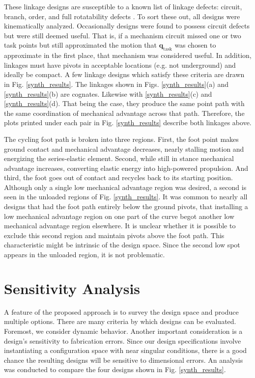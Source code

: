 \documentclass[journal]{IEEEtran}
\begin{document}
These linkage designs are susceptible to a known list of linkage defects: circuit, branch, order, and full rotatability defects \cite{balliDefectsLinkMechanisms2002}.
To sort these out, all designs were kinematically analyzed.
Occasionally designs were found to possess circuit defects but were still deemed useful.
That is, if a mechanism circuit missed one or two task points but still approximated the motion that $\mathbf{q}_\text{task}$ was chosen to approximate in the first place, that mechanism was considered useful.
In addition, linkages must have pivots in acceptable locations (e.g. not underground) and ideally be compact.
A few linkage designs which satisfy these criteria are drawn in Fig. \ref{synth_results}.
The linkages shown in Figs. \ref{synth_results}(a) and \ref{synth_results}(b) are cognates.  Likewise with \ref{synth_results}(c) and \ref{synth_results}(d).
That being the case, they produce the same point path with the same coordination of mechanical advantage across that path.
Therefore, the plots printed under each pair in Fig. \ref{synth_results} describe both linkages above.





The cycling foot path is broken into three regions.  
First, the foot point makes ground contact and mechanical advantage decreases, nearly stalling motion and energizing the series-elastic element.
Second, while still in stance mechanical advantage increases, converting elastic energy into high-powered propulsion.
And third, the foot goes out of contact and recycles back to its starting position.
Although only a single low mechanical advantage region was desired, a second is seen in the unloaded regions of Fig. \ref{synth_results}.
It was common to nearly all designs that had the foot path entirely below the ground pivots, that installing a low mechanical advantage region on one part of the curve begot another low mechanical advantage region elsewhere.
It is unclear whether it is possible to exclude this second region and maintain pivots above the foot path.
This characteristic might be intrinsic of the design space.
Since the second low spot appears in the unloaded region, it is not problematic.


\section{Sensitivity Analysis}
\label{sec:sensitivity}

A feature of the proposed approach is to survey the design space and produce multiple options.
There are many criteria by which designs can be evaluated.
Foremost, we consider dynamic behavior.
Another important consideration is a design's sensitivity to fabrication errors.
Since our design specifications involve instantiating a configuration space with near singular conditions, there is a good chance the resulting designs will be sensitive to dimensional errors.
An analysis was conducted to compare the four designs shown in Fig. \ref{synth_results}.
\end{document}
